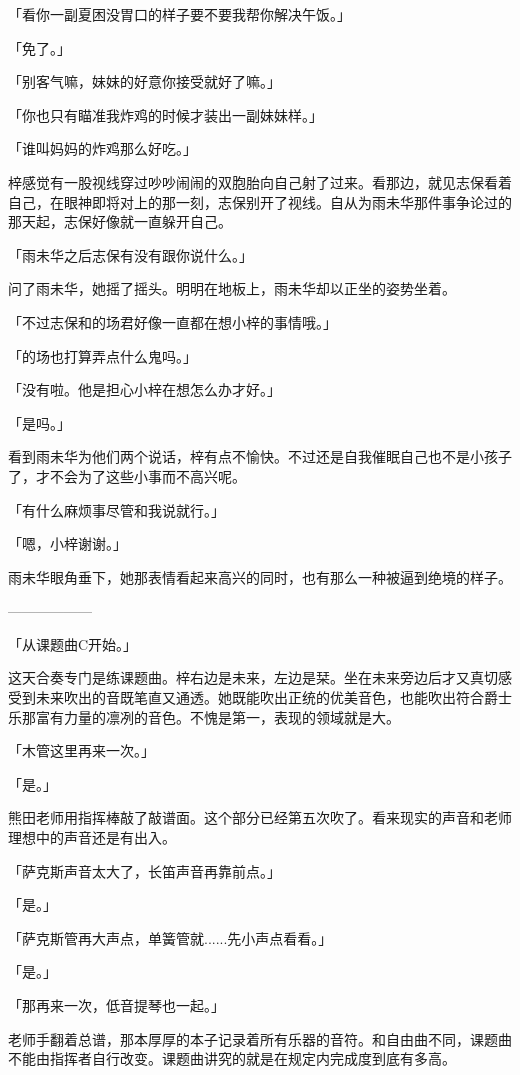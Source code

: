 \documentclass[UTF8]{ctexart}
\begin{document}
    「看你一副夏困没胃口的样子要不要我帮你解决午饭。」

    「免了。」

    「别客气嘛，妹妹的好意你接受就好了嘛。」

    「你也只有瞄准我炸鸡的时候才装出一副妹妹样。」

    「谁叫妈妈的炸鸡那么好吃。」

    梓感觉有一股视线穿过吵吵闹闹的双胞胎向自己射了过来。看那边，就见志保看着自己，在眼神即将对上的那一刻，志保别开了视线。自从为雨未华那件事争论过的那天起，志保好像就一直躲开自己。

    「雨未华之后志保有没有跟你说什么。」

    问了雨未华，她摇了摇头。明明在地板上，雨未华却以正坐的姿势坐着。

    「不过志保和的场君好像一直都在想小梓的事情哦。」

    「的场也打算弄点什么鬼吗。」

    「没有啦。他是担心小梓在想怎么办才好。」

    「是吗。」

    看到雨未华为他们两个说话，梓有点不愉快。不过还是自我催眠自己也不是小孩子了，才不会为了这些小事而不高兴呢。

    「有什么麻烦事尽管和我说就行。」

    「嗯，小梓谢谢。」

    雨未华眼角垂下，她那表情看起来高兴的同时，也有那么一种被逼到绝境的样子。

    ——————

    「从课题曲C开始。」

    这天合奏专门是练课题曲。梓右边是未来，左边是栞。坐在未来旁边后才又真切感受到未来吹出的音既笔直又通透。她既能吹出正统的优美音色，也能吹出符合爵士乐那富有力量的凛冽的音色。不愧是第一，表现的领域就是大。

    「木管这里再来一次。」

    「是。」

    熊田老师用指挥棒敲了敲谱面。这个部分已经第五次吹了。看来现实的声音和老师理想中的声音还是有出入。

    「萨克斯声音太大了，长笛声音再靠前点。」

    「是。」

    「萨克斯管再大声点，单簧管就......先小声点看看。」

    「是。」

    「那再来一次，低音提琴也一起。」

    老师手翻着总谱，那本厚厚的本子记录着所有乐器的音符。和自由曲不同，课题曲不能由指挥者自行改变。课题曲讲究的就是在规定内完成度到底有多高。
\end{document}
